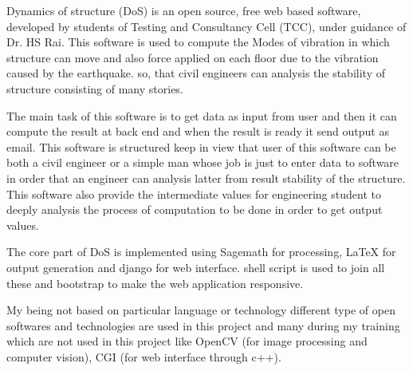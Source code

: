 Dynamics of structure (DoS) is an open source, free web based software, developed by students of 
Testing and Consultancy Cell (TCC), under guidance of Dr. HS Rai. This software is used to compute the 
Modes of vibration in which structure can move and also force applied on each floor 
due to the vibration caused by the earthquake. so, that civil engineers can
analysis the stability of structure consisting of many stories.

 The main task of this software is to get data as input from user and then it can compute 
the result at back end and when the result is ready it send output as email.
This software is structured keep in view that user of this software can be both 
a civil engineer or a simple man whose job is just to enter data to software 
in order that an engineer can analysis latter from result stability of the structure.
This software also provide the intermediate values for engineering student 
to deeply analysis the process of computation to be done in order to get output values. 


The core part of DoS is implemented using Sagemath for processing,  \LaTeX{} for output generation and django 
for web interface. shell script is used to join all these and bootstrap to make 
the web application responsive.


My being not based on particular language or technology different type of open softwares and technologies are 
used in this project and many during my training which are not used in this 
project like OpenCV (for image processing and computer vision), CGI (for web interface through c++).
